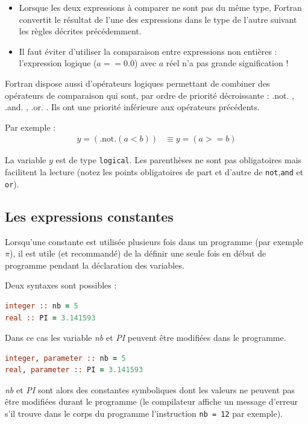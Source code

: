 \documentclass[a4paper,twoside]{article}
\begin{document}
\begin{itemize}
\item Lorsque les deux expressions à comparer ne sont pas du même type, Fortran convertit le résultat de l'une des expressions dans le type de l'autre suivant les règles décrites précédemment.

\item Il faut éviter d'utiliser la comparaison entre expressions non 
entières : l'expression logique ($a == 0.0$) avec $a$ réel n'a pas grande 
signification ! 
\end{itemize}

Fortran dispose aussi d'opérateurs logiques permettant de 
combiner des opérateurs de compa\-rai\-son qui sont, par ordre de 
priorité décroissante : \og .not. \fg, \og .and. \fg, \og .or. \fg. Ils ont une 
priorité inférieure aux opérateurs précédents. 

Par exemple :
\begin{align}
y = (\mbox{.not.}(a<b)) &\equiv y = (a>=b) 
\end{align}

La variable $y$ est de type \texttt{logical}. Les parenthèses ne sont 
pas obligatoires mais facilitent la lecture (notez les points 
obligatoires de part et d'autre de \texttt{not},\texttt{and} et \texttt{or}).

\subsection{Les expressions constantes}\label{sec:constantes}
Lorsqu'une constante est utilisée plusieurs fois dans un programme (par exemple $\pi$), il est utile (et recommandé) de la définir une seule fois en début de programme pendant la déclaration des variables.
 
Deux syntaxes sont possibles :
\begin{lstlisting}[language=Fortran]
integer :: nb = 5
real :: PI = 3.141593
\end{lstlisting}
Dans ce cas les variable \emph{nb} et \emph{PI} peuvent être modifiées dans le programme.

\begin{lstlisting}[language=Fortran]
integer, parameter :: nb = 5
real, parameter :: PI = 3.141593
\end{lstlisting}
\emph{nb} et \emph{PI} sont alors des constantes symboliques dont les valeurs ne peuvent pas être modi\-fiées durant le programme (le compilateur affiche un message d'erreur s'il trouve dans le corps du programme l'instruction \texttt{nb = 12} par exemple).
\end{document}
